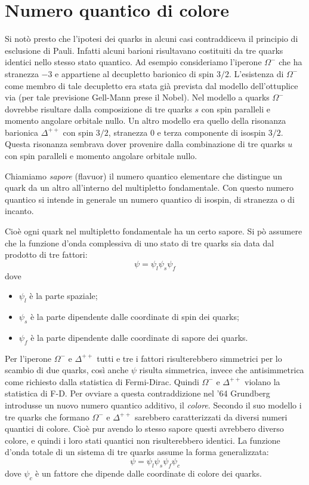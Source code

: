 \section{Numero quantico di colore}
Si notò presto che l'ipotesi dei quarks in alcuni casi contraddiceva il 
principio di esclusione di Pauli.
Infatti alcuni barioni risultavano costituiti da tre quarks identici nello 
stesso stato quantico. Ad esempio
consideriamo l'iperone $\Omega^-$ che ha stranezza $-3$ e appartiene al 
decupletto barionico di spin $3/2$.
L'esistenza di $\Omega^-$ come membro di tale decupletto era stata già 
prevista dal modello dell'ottuplice via (per
tale previsione Gell-Mann prese il Nobel).
Nel modello a quarks $\Omega^-$ dovrebbe risultare dalla composizione di tre 
quarks $s$ con spin paralleli e
momento angolare orbitale nullo.
Un altro modello era quello della risonanza barionica $\Delta^{++}$ con spin 
$3/2$, stranezza $0$ e terza
componente di isospin $3/2$.
Questa risonanza sembrava dover provenire dalla combinazione di tre quarks $u$ 
con spin paralleli e momento
angolare orbitale nullo.

Chiamiamo \textit{sapore} (flavuor) il numero quantico elementare che distingue 
un quark da un altro all'interno
del multipletto fondamentale.
Con questo numero quantico si intende in generale un numero quantico di 
isospin, di stranezza o di incanto.

Cioè ogni quark nel multipletto fondamentale ha un certo sapore. Si pò 
assumere che la funzione d'onda complessiva
di uno stato di tre quarks sia data dal prodotto di tre fattori:
\begin{equation}
\psi=\psi_l\psi_s\psi_f
\end{equation}
dove
\begin{itemize}
\item $\psi_l$ è la parte spaziale;
\item $\psi_s$ è la parte dipendente dalle coordinate di spin dei quarks;
\item $\psi_f$ è la parte dipendente dalle coordinate di sapore dei quarks.
\end{itemize}

Per l'iperone $\Omega^-$ e $\Delta^{++}$ tutti e tre i fattori risulterebbero 
simmetrici per lo scambio di due
quarks, così anche $\psi$ risulta simmetrica, invece che antisimmetrica come 
richiesto dalla statistica di
Fermi-Dirac.
Quindi $\Omega^-$ e $\Delta^{++}$ violano la statistica di F-D. Per ovviare a 
questa contraddizione nel
'64 Grundberg introdusse un nuovo numero quantico additivo, il \textit{colore}.
Secondo il suo modello i tre quarks che formano $\Omega^-$ e $\Delta^{++}$ 
sarebbero caratterizzati da diversi
numeri quantici di colore. Cioè pur avendo lo stesso sapore questi avrebbero 
diverso colore,
e quindi i loro stati quantici non risulterebbero identici.
La funzione d'onda totale di un sistema di tre quarks assume la forma 
generalizzata:
\begin{equation}
\psi=\psi_l\psi_s\psi_f\psi_c
\end{equation}
dove $\psi_c$ è un fattore che dipende dalle coordinate di colore dei quarks.

